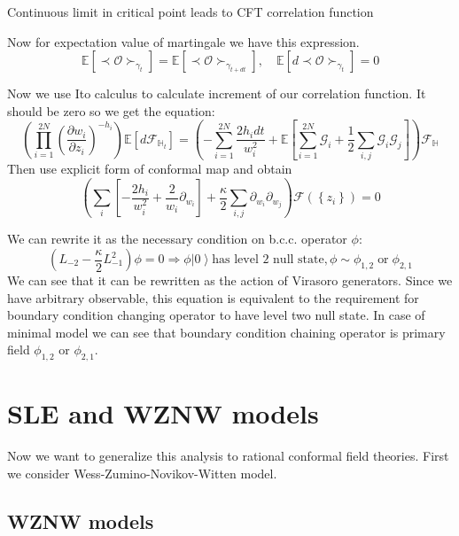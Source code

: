 \documentclass[12pt]{article}
\theoremstyle{definition}
\theoremstyle{definition} \newtheorem{Def}{Definition}
\begin{document}
Continuous limit in critical point leads to CFT correlation function

Now for expectation value of martingale we have this expression.
\begin{equation*}
  \mathbb{E}\left[\prec\mathcal{O}\succ_{\gamma_{t}}\right]=    \mathbb{E}\left[\prec\mathcal{O}\succ_{\gamma_{t+dt}}\right], \quad \mathbb{E}\left[d \prec\mathcal{O}\succ_{\gamma_{t}}\right]=0
\end{equation*}

Now we use Ito calculus to calculate increment of our correlation function. It should be zero so we get the equation:
\begin{equation}
  \left(\prod_{i=1}^{2N}\left(\frac{\partial w_{i}}{\partial z_{i}}\right)^{-h_{i}}\right)\mathbb{E}\left[d 
    \mathcal{F}_{\mathbb{H}_{t}}\right]=\left(-\sum_{i=1}^{2N}\frac{2h_{i}dt}{w_{i}^{2}}+\mathbb{E}\left[\sum_{i=1}^{2N}\mathcal{G}_{i}+\frac{1}{2}
      \sum_{i,j}\mathcal{G}_{i}\mathcal{G}_{j}\right]\right)\mathcal{F}_{\mathbb{H}}
\label{eq:8}
\end{equation}
Then use explicit form of conformal map and obtain
\begin{equation*}
  \left( \sum_{i}\left[-\frac{2h_{i}}{w_{i}^{2}} +\frac{2}{w_{i}}\partial_{w_{i}}\right]+\frac{\kappa}{2}\sum_{i,j}\partial_{w_{i}} \partial_{w_{j}}\right)\mathcal{F}(\left\{z_{i}\right\})=0
\end{equation*}

We can rewrite it as the necessary condition on b.c.c. operator $\phi$:
\begin{equation*}
  (L_{-2}-\frac{\kappa}{2}L_{-1}^{2})\phi=0 \Longrightarrow \phi \left|0\right>  \text{has level 2 null state}, \phi\sim \phi_{1,2} \;\text{or}\; \phi_{2,1}
\end{equation*}
We can see that it can be rewritten as the action of Virasoro generators. Since we have arbitrary observable, this equation is equivalent to the requirement for boundary condition changing operator to have level two null state. 
In case of minimal model we can see that boundary condition chaining operator is primary field $\phi_{1,2}$ or $\phi_{2,1}$.

\section{SLE and WZNW models}
\label{sec:sle-wzw-models}
Now we want to generalize this analysis to rational conformal field theories. First we consider Wess-Zumino-Novikov-Witten model.
\subsection{WZNW models}
\end{document}
